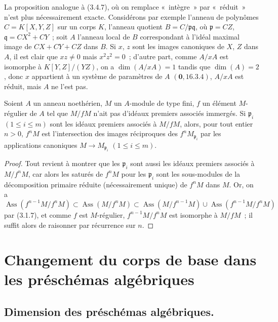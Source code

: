\begin{remark}[3.4.8]
\label{IV.2.3.4.8-fr}
La proposition analogue à (3.4.7), où on remplace «~intègre~» par
«~réduit~» n'est plus nécessairement exacte. Considérons par exemple l'anneau
de polynômes $C=K[X,Y,Z]$ sur un corps $K$, l'anneau quotient
$B=C/\mathfrak p\mathfrak q$, où $\mathfrak p=CZ$,
$\mathfrak q=CX^2+CY$~; soit $A$ l'anneau local de $B$ correspondant à l'idéal
maximal image de $CX+CY+CZ$ dans $B$. Si $x$, $z$ sont les images canoniques
de $X$, $Z$ dans $A$, il est clair que $xz\neq0$ mais $x^2z^2=0$~; d'autre
part, comme $A/xA$ est isomorphe à $K[Y,Z]/(YZ)$, on a
$\dim(A/xA)=1$ tandis que $\dim(A)=2$, donc $x$ appartient à un système de
paramètres de $A$ $(\mathbf{0},16.3.4)$, $A/xA$ est réduit, mais $A$ ne l'est pas.
\end{remark}

\begin{proposition}[3.4.9]
\label{IV.2.3.4.9-fr}
Soient $A$ un anneau noethérien, $M$ un $A$-module de type fini, $f$ un
élément $M$-régulier de $A$ tel que $M/fM$ n'ait pas d'idéaux premiers
associés immergés. Si $\mathfrak p_i$ $(1\leqslant i\leqslant m)$ sont les
idéaux premiers associés à $M/fM$, alors, pour tout entier $n>0$, $f^nM$ est
l'intersection des images réciproques des $f^nM_{\mathfrak p_i}$ par les
applications canoniques $M\to M_{\mathfrak p_i}$ $(1\leqslant i\leqslant m)$.
\end{proposition}

\begin{proof}
Tout revient à montrer que les $\mathfrak p_i$ sont aussi les idéaux premiers
associés à $M/f^nM$, car alors les saturés de $f^nM$ pour les
$\mathfrak p_i$ sont les sous-modules de la décomposition primaire réduite
(nécessairement unique) de $f^nM$ dans $M$. Or, on a
\[
\operatorname{Ass}(f^{n-1}M/f^nM)
\subset\operatorname{Ass}(M/f^nM)
\subset\operatorname{Ass}(M/f^{n-1}M)
\cup\operatorname{Ass}(f^{n-1}M/f^nM)
\]
par (3.1.7), et comme $f$ est $M$-régulier,
$f^{n-1}M/f^nM$ est isomorphe à $M/fM$~; il suffit alors de raisonner par
récurrence sur $n$.
\end{proof}

\section{Changement du corps de base dans les préschémas algébriques}
\label{IV.2.4-fr}

\subsection{Dimension des préschémas algébriques.}
\label{subsection:IV.2.4.1-fr}


